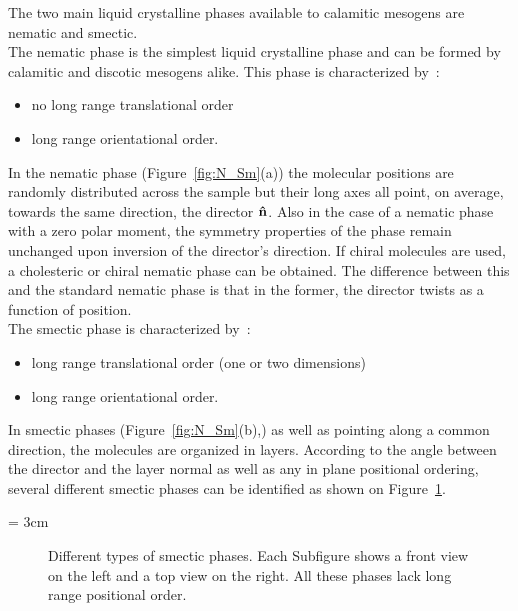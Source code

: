 The two main liquid crystalline phases available to calamitic mesogens are nematic and smectic.\\
The nematic phase is the simplest liquid crystalline phase and can be formed by calamitic and
discotic mesogens alike. This phase is characterized by~:
\begin{itemize}
	\item no long range translational order
	\item long range orientational order.
\end{itemize}
%
In the nematic phase (Figure~\ref{fig:N_Sm}(a)) the molecular positions are randomly distributed across 
the sample but their long axes all point, on average, towards the same direction, the director 
$\mathbf{\hat{n} }$. Also in the case of a nematic phase with a zero polar moment, the symmetry 
properties of the phase remain unchanged upon inversion of the director's direction.
If chiral molecules are used, a cholesteric or chiral nematic phase can be obtained. 
The difference between this and  the standard nematic phase is that in the former, the director 
twists as a function of position.\\


The smectic phase is characterized by~:
\begin{itemize}
	\item long range translational order (\ie one or two dimensions)
	\item long range orientational order.
\end{itemize}
%
In smectic phases (Figure~\ref{fig:N_Sm}(b),) as well as pointing along a common direction, the molecules are organized in
layers. According to the angle between the director and the layer normal as well
as any in plane positional ordering, several different smectic phases can be identified as shown
on Figure~\ref{fig:SmPhases}.

\picW = 3cm
\begin{figure}
	\centering
	\caption{Different types of smectic phases. Each Subfigure shows a front view on the
	left and a top view on the right. All these phases lack long range positional order.}
	\label{fig:SmPhases}
\end{figure}



